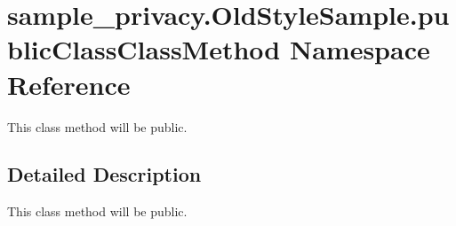 \hypertarget{namespacesample__privacy_1_1_old_style_sample_1_1public_class_class_method}{\section{sample\-\_\-privacy.\-Old\-Style\-Sample.\-public\-Class\-Class\-Method Namespace Reference}
\label{namespacesample__privacy_1_1_old_style_sample_1_1public_class_class_method}
}


This class method will be public.  




\subsection{Detailed Description}
This class method will be public. 